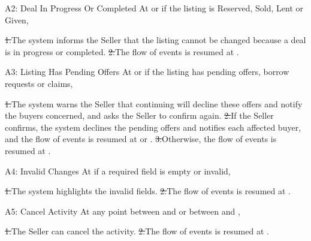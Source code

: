 \begin{flowblock}{A2: Deal In Progress Or Completed}
At  or  if the listing is Reserved, Sold, Lent or Given,\par
\st{1.}{The system informs the Seller that the listing cannot be changed because a deal is in progress or completed.}
\st{2.}{The flow of events is resumed at .}
\end{flowblock}
\begin{flowblock}{A3: Listing Has Pending Offers}
At  or  if the listing has pending offers, borrow requests or claims,\par
\st{1.}{The system warns the Seller that continuing will decline these offers and notify the buyers concerned, and asks the Seller to confirm again.}
\st{2.}{If the Seller confirms, the system declines the pending offers and notifies each affected buyer, and the flow of events is resumed at  or .}
\st{3.}{Otherwise, the flow of events is resumed at .}
\end{flowblock}
\begin{flowblock}{A4: Invalid Changes}
At  if a required field is empty or invalid,\par
\st{1.}{The system highlights the invalid fields.}
\st{2.}{The flow of events is resumed at .}
\end{flowblock}
\begin{flowblock}{A5: Cancel Activity}
At any point between  and  or between  and ,\par
\st{1.}{The Seller can cancel the activity.}
\st{2.}{The flow of events is resumed at .}
\end{flowblock}

